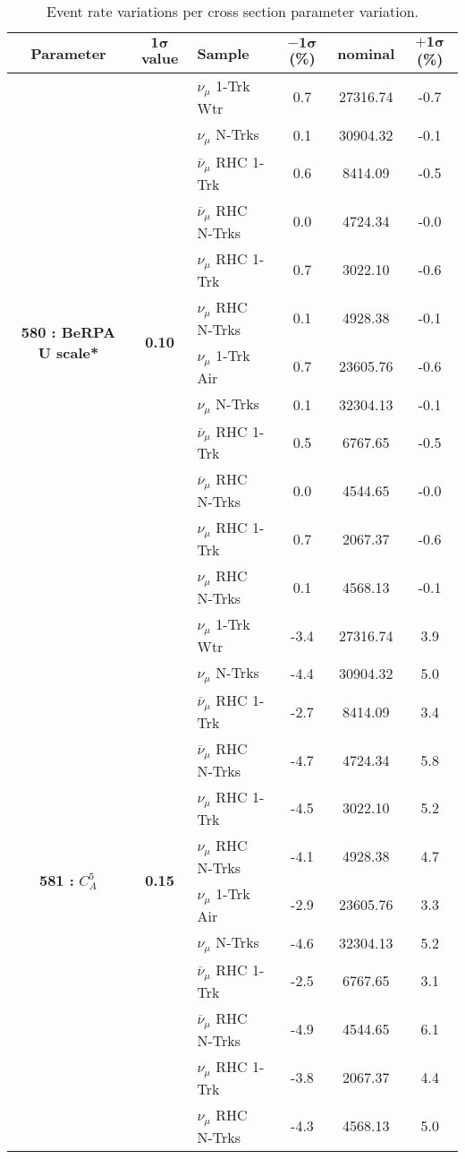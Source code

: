 \addtocounter{table}{-1}
\begin{table}[ht!]
\centering
\begin{tabular}{ c  c  l  c  c  c }
\midrule[1.3pt]
\textbf{Parameter} & \textbf{$\mathbf{1\sigma}$ value} & \textbf{Sample} & \textbf{$\mathbf{-1\sigma}$ (\%)}  &  \textbf{nominal}  &  \textbf{$\mathbf{+1\sigma}$ (\%)} \\
\midrule[1.3pt]
\multirow{12}{*}{\textbf{580 : BeRPA U scale*}} & \multirow{12}{*}{\textbf{0.10}} & $\nu_\mu$ 1-Trk Wtr &   0.7 &  27316.74 &   -0.7 \\ 
 &  & $\nu_\mu$ N-Trks &   0.1 &  30904.32 &   -0.1 \\ 
 &  & $\overline{\nu}_\mu$ RHC 1-Trk &   0.6 &  8414.09 &   -0.5 \\ 
 &  & $\overline{\nu}_\mu$ RHC N-Trks &   0.0 &  4724.34 &   -0.0 \\ 
 &  & $\nu_\mu$ RHC 1-Trk &   0.7 &  3022.10 &   -0.6 \\ 
 &  & $\nu_\mu$ RHC N-Trks &   0.1 &  4928.38 &   -0.1 \\ 
 &  & $\nu_\mu$ 1-Trk Air &   0.7 &  23605.76 &   -0.6 \\ 
 &  & $\nu_\mu$ N-Trks &   0.1 &  32304.13 &   -0.1 \\ 
 &  & $\overline{\nu}_\mu$ RHC 1-Trk &   0.5 &  6767.65 &   -0.5 \\ 
 &  & $\overline{\nu}_\mu$ RHC N-Trks &   0.0 &  4544.65 &   -0.0 \\ 
 &  & $\nu_\mu$ RHC 1-Trk &   0.7 &  2067.37 &   -0.6 \\ 
 &  & $\nu_\mu$ RHC N-Trks &   0.1 &  4568.13 &   -0.1 \\ 
\midrule[1.3pt]
\multirow{12}{*}{\textbf{581 : }$C_A^5$} & \multirow{12}{*}{\textbf{0.15}} & $\nu_\mu$ 1-Trk Wtr &   -3.4 &  27316.74 &   3.9 \\ 
 &  & $\nu_\mu$ N-Trks &   -4.4 &  30904.32 &   5.0 \\ 
 &  & $\overline{\nu}_\mu$ RHC 1-Trk &   -2.7 &  8414.09 &   3.4 \\ 
 &  & $\overline{\nu}_\mu$ RHC N-Trks &   -4.7 &  4724.34 &   5.8 \\ 
 &  & $\nu_\mu$ RHC 1-Trk &   -4.5 &  3022.10 &   5.2 \\ 
 &  & $\nu_\mu$ RHC N-Trks &   -4.1 &  4928.38 &   4.7 \\ 
 &  & $\nu_\mu$ 1-Trk Air &   -2.9 &  23605.76 &   3.3 \\ 
 &  & $\nu_\mu$ N-Trks &   -4.6 &  32304.13 &   5.2 \\ 
 &  & $\overline{\nu}_\mu$ RHC 1-Trk &   -2.5 &  6767.65 &   3.1 \\ 
 &  & $\overline{\nu}_\mu$ RHC N-Trks &   -4.9 &  4544.65 &   6.1 \\ 
 &  & $\nu_\mu$ RHC 1-Trk &   -3.8 &  2067.37 &   4.4 \\ 
 &  & $\nu_\mu$ RHC N-Trks &   -4.3 &  4568.13 &   5.0 \\ 
\midrule[1.3pt]
\end{tabular}
\centering
\caption*{Event rate variations per cross section parameter variation.}
\end{table}
\addtocounter{table}{-1}


